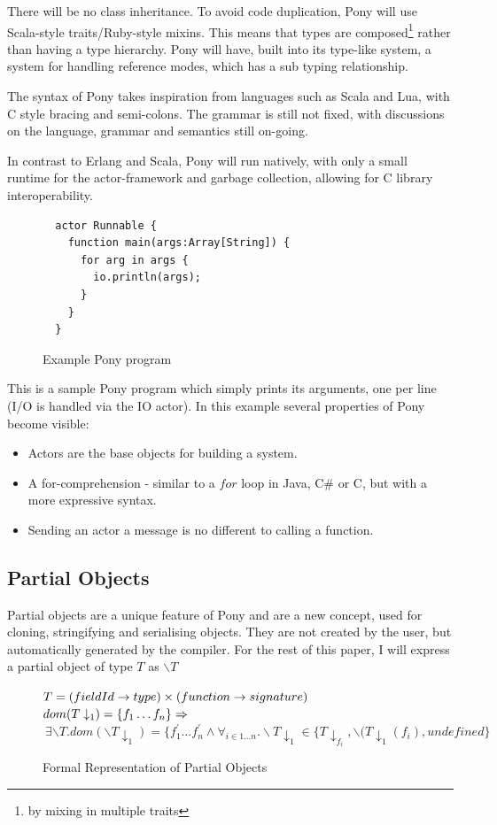 \documentclass[pdftex,12pt,a4paper]{article}
\begin{document}
There will be no class inheritance.
To avoid code duplication, Pony will use Scala-style traits/Ruby-style mixins.
This means that types are composed\footnote{by mixing in multiple traits} rather than having a type hierarchy.
Pony will have, built into its type-like system, a system for handling reference modes, which has a sub typing relationship.

The syntax of Pony takes inspiration from languages such as Scala and Lua, with C style bracing and semi-colons.
The grammar is still not fixed, with discussions on the language, grammar and semantics still on-going.

In contrast to Erlang and Scala, Pony will run natively, with only a small runtime for the actor-framework and garbage collection, allowing for C library interoperability.

\begin{figure}[H]
\begin{verbatim}
  actor Runnable {
    function main(args:Array[String]) {
      for arg in args {
      	io.println(args);
      }
    }
  }
\end{verbatim}
\caption{Example Pony program}
\label{fig:simple}
\end{figure}

This is a sample Pony program which simply prints its arguments, one per line (I/O is handled via the IO actor).
In this example several properties of Pony become visible:
\begin{itemize}
\item Actors are the base objects for building a system.
\item A for-comprehension - similar to a $for$ loop in Java, C\# or C, but with
      a more expressive syntax.
\item Sending an actor a message is no different to calling a function.
\end{itemize}

\subsection{Partial Objects}

Partial objects are a unique feature of Pony and are a new concept, used for cloning, stringifying and serialising objects.
They are not created by the user, but automatically generated by the compiler.
For the rest of this paper, I will express a partial object of type $T$ as $\backslash T$

\begin{figure}[H]
$T = (fieldId \to type) \times (function \to signature)\\$
$dom(T\downarrow_{1}) = \{ f_{1} \dots f_{n} \} \Rightarrow\\$
$\> \exists \backslash T.dom(\backslash T\downarrow_{1}) = \{f_{1}^{'}\dots f_{n}^{'}\wedge
\forall_{i\in 1\dots n}.\backslash T\downarrow_{1} \in \{T\downarrow_{f_{i}}, 
\backslash(T\downarrow_{1}(f_{i}), undefined\}$
\caption{Formal Representation of Partial Objects}
\end{figure}
\end{document}
